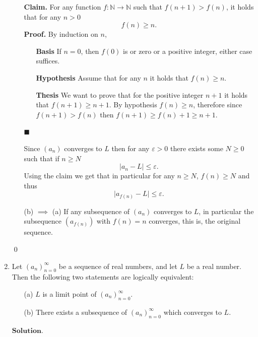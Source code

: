\documentclass{article}
\theoremstyle{remark}
\newenvironment{claim}{\textbf{Claim.}}{}
\begin{document}
\begin{enumerate}
\begin{enumerate}
        \begin{claim}
            For any function $f: \mathbb{N} \to \mathbb{N}$ such that $f(n+1) > f(n)$, it holds that for any $n > 0$
            \[
            f(n) \geq n.
            \]
        \end{claim}
        \textbf{Proof.} By induction on $n$, 
        \begin{enumerate}
            \item[\textbf{Basis}]
            If $n = 0$, then $f(0)$ is or zero or a positive integer, either case suffices.  
            \item[\textbf{Hypothesis}]
            Assume that for any $n$ it holds that $f(n) \geq n$.
            \item[\textbf{Thesis}] 
            We want to prove that for the positive integer $n+1$ it holds that $f(n+1) \geq n+1$.
            By hypothesis $f(n) \geq n$, therefore since $f(n+1) > f(n)$ then $f(n+1) \geq f(n)+1 \geq n + 1$.
        \end{enumerate}
        \begin{flushright}
            $\blacksquare$
        \end{flushright}
        Since $(a_n)$ converges to $L$ then for any $\varepsilon > 0$ there exists some $N \geq 0$ such that if $n \geq N$
        \[
        \vert a_n - L\vert \leq \varepsilon.
        \]
        Using the claim we get that in particular for any $n\geq N$, $f(n) \geq N$ and thus
        \[
        \vert a_{f(n)} - L\vert \leq \varepsilon.
        \]

        \item[(b) $\implies$ (a)] If any subsequence of $(a_n)$ converges to $L$, in particular the subsequence $(a_{f(n)})$ with 
        $f(n) = n$ converges, this is, the original sequence. 
    \end{enumerate}
    \begin{flushright}
        \qed
    \end{flushright}

    \item Let $(a_n)_{n=0}^\infty$ be a sequence of real numbers, and let $L$ be a real number. Then the following two statements are logically equivalent:

    \begin{enumerate}
        \item[(a)] $L$ is a limit point of $(a_n)_{n=0}^\infty$.
        \item[(b)] There exists a subsequence of $(a_n)_{n=0}^\infty$ which converges to $L$.
    \end{enumerate}
    $\textbf{Solution.}$



\end{enumerate}
\end{document}
